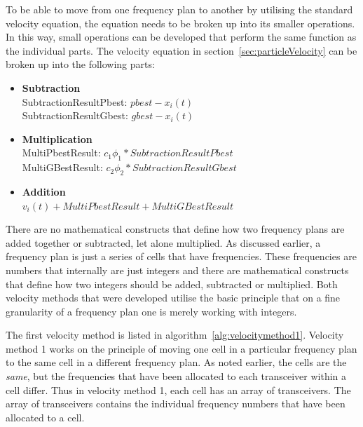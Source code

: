 To be able to move from one frequency plan to another by utilising the standard velocity equation, the equation needs to be broken up into its smaller operations. In this way, small operations can be developed that perform the same function as the individual parts. The velocity equation in section~\ref{sec:particleVelocity} can be broken up into the following parts:
\label{lst:velocitybreakup}
\begin{itemize}
\item \textbf{Subtraction} \\SubtractionResultPbest: $pbest - x_i(t)$\\SubtractionResultGbest: $gbest - x_i(t)$
\item \textbf{Multiplication} \\MultiPbestResult: $c_1\phi_1 * SubtractionResultPbest$\\MultiGBestResult: $c_2\phi_2 * SubtractionResultGbest$ 
\item \textbf{Addition}\\$v_i(t) + MultiPbestResult + MultiGBestResult$
\end{itemize}
There are no mathematical constructs that define how two frequency plans are added together or subtracted, let alone multiplied. As discussed earlier, a frequency plan is just a series of cells that have frequencies. These frequencies are numbers that internally are just integers and there are mathematical constructs that define how two integers should be added, subtracted or multiplied. Both velocity methods that were developed utilise the basic principle that on a fine granularity of a frequency plan one is merely working with integers.


The first velocity method is listed in algorithm~\ref{alg:velocitymethod1}. Velocity method 1 works on the principle of moving one cell in a particular frequency plan to the same cell in a different frequency plan. As noted earlier, the cells are the \emph{same}, but the frequencies that have been allocated to each transceiver within a cell differ. Thus in velocity method 1, each cell has an array of transceivers. The array of transceivers contains the individual frequency numbers that have been allocated to a cell.

